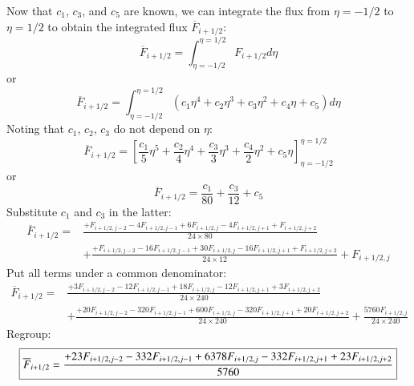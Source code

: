 \documentclass{warpdoc}
\newcommand\frameeqn[1]{\fbox{$\displaystyle #1$}}
\begin{document}
Now that $c_1$, $c_3$, and $c_5$ are known, we can integrate the flux from $\eta=-1/2$ to $\eta=1/2$ to obtain the integrated flux $\overline{F}_{i+1/2}$:
%
\begin{equation}
\overline{F}_{i+1/2}=\int_{\eta=-1/2}^{\eta=1/2} F_{i+1/2} d\eta
\end{equation}
%
or
%
\begin{equation}
\overline{F}_{i+1/2}=\int_{\eta=-1/2}^{\eta=1/2} \left( c_1 \eta^4 + c_2 \eta^3 + c_3 \eta^2 + c_4 \eta + c_5 \right) d\eta
\end{equation}
%
Noting that $c_1$, $c_2$, $c_3$ do not depend on $\eta$:
%
\begin{equation}
\overline{F}_{i+1/2}= \left[ \frac{c_1}{5} \eta^5 + \frac{c_2}{4} \eta^4 + \frac{c_3}{3} \eta^3 + \frac{c_4}{2} \eta^2 + c_5 \eta \right]_{\eta=-1/2}^{\eta=1/2}
\end{equation}
%
or
%
\begin{equation}
\overline{F}_{i+1/2}=  \frac{c_1}{80}  + \frac{c_3}{12}   + c_5  
\end{equation}
%
Substitute $c_1$ and $c_3$ in the latter:
%
\begin{align}
\overline{F}_{i+1/2}= & \frac{+F_{i+1/2,j-2} -4 F_{i+1/2,j-1}+ 6 F_{i+1/2,j} -4 F_{i+1/2,j+1} +F_{i+1/2,j+2}}{24\times 80}\nonumber\\
 &+ \frac{+ F_{i+1/2,j-2} -16 F_{i+1/2,j-1}+ 30 F_{i+1/2,j} -16 F_{i+1/2,j+1} +F_{i+1/2,j+2}}{24\times 12}  
 + F_{i+1/2,j} 
\end{align}
%
Put all terms under a common denominator:
%
\begin{align}
\overline{F}_{i+1/2}= & \frac{+3 F_{i+1/2,j-2} -12 F_{i+1/2,j-1}+ 18 F_{i+1/2,j} - 12 F_{i+1/2,j+1} +3F_{i+1/2,j+2}}{24\times 240}\nonumber\\
 &+ \frac{+ 20 F_{i+1/2,j-2} -320 F_{i+1/2,j-1}+ 600 F_{i+1/2,j} -320 F_{i+1/2,j+1} +20 F_{i+1/2,j+2}}{24\times 240}  
 + \frac{ 5760 F_{i+1/2,j}}{24\times 240} 
\end{align}
%
Regroup:
%
\begin{equation}
\frameeqn{
\overline{F}_{i+1/2}=  \frac{+23 F_{i+1/2,j-2} -332 F_{i+1/2,j-1}+ 6378 F_{i+1/2,j} - 332 F_{i+1/2,j+1} + 23 F_{i+1/2,j+2}}{5760}
}
\end{equation}
%





\appendix


  
  
\end{document}
